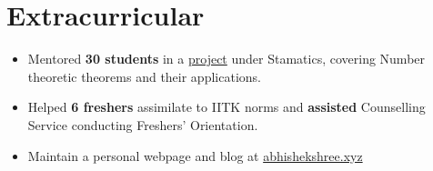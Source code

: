\section*{\sc Extracurricular}
\vspace{-2mm}
\hrulefill
\vspace{1mm}

\begin{itemize}
  \item Mentored \textbf{30 students} in a  \href{https://abhishekshree.github.io/number-theory-applications}{project} under Stamatics, covering Number theoretic theorems and their applications.
  \item Helped \textbf{6 freshers} assimilate to IITK norms and \textbf{assisted} Counselling Service conducting Freshers' Orientation.
  \item Maintain a personal webpage and blog at \href{https://abhishekshree.xyz/}{abhishekshree.xyz}
\end{itemize}
